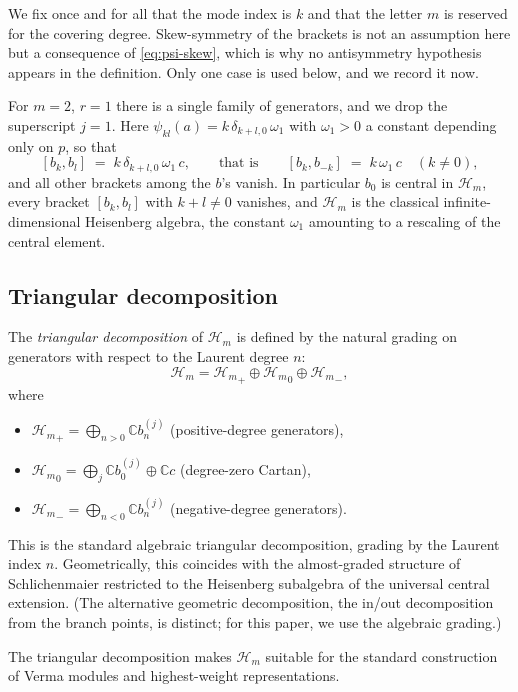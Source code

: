 \documentclass[12pt]{amsart}
\theoremstyle{plain}
\theoremstyle{definition}
\newcommand{\CC}{\mathbb{C}}
\newcommand{\Hm}{{\mathcal{H}_m}}     %
\begin{document}
We fix once and for all that the mode index is $k$ and that the letter
$m$ is reserved for the covering degree. Skew-symmetry of the brackets
is not an assumption here but a consequence of \eqref{eq:psi-skew},
which is why no antisymmetry hypothesis appears in the definition. Only
one case is used below, and we record it now.

For $m = 2$, $r = 1$ there is a single family of generators, and we drop
the superscript $j = 1$. Here
$\psi_{kl}(a) = k\,\delta_{k+l,0}\,\omega_1$ with $\omega_1 > 0$ a
constant depending only on $p$, so that
\begin{equation}\label{eq:psi-r1}
  [b_k, b_l] \;=\; k\,\delta_{k+l,0}\, \omega_1 \, c,
  \qquad\text{that is}\qquad
  [b_k, b_{-k}] \;=\; k\,\omega_1\,c \quad (k \neq 0),
\end{equation}
and all other brackets among the $b$'s vanish. In particular $b_0$ is
central in $\Hm$, every bracket $[b_k, b_l]$ with $k + l \neq 0$
vanishes, and $\Hm$ is the classical infinite-dimensional Heisenberg
algebra, the constant $\omega_1$ amounting to a rescaling of the central
element.

\subsection{Triangular decomposition}
\label{subsec:triangular}

The \emph{triangular decomposition} of $\Hm$ is defined by the
natural grading on generators with respect to the Laurent degree $n$:
\[
  \Hm = \Hm_+ \oplus \Hm_0 \oplus \Hm_-,
\]
where
\begin{itemize}
  \item $\Hm_+ = \bigoplus_{n > 0} \CC b_n^{(j)}$ (positive-degree generators),
  \item $\Hm_0 = \bigoplus_{j} \CC b_0^{(j)} \oplus \CC c$ (degree-zero Cartan),
  \item $\Hm_- = \bigoplus_{n < 0} \CC b_n^{(j)}$ (negative-degree generators).
\end{itemize}
This is the standard algebraic triangular decomposition, grading by
the Laurent index $n$. Geometrically, this coincides with the
almost-graded structure of Schlichenmaier \cite{Schlichenmaier2014}
restricted to the Heisenberg subalgebra of the universal central
extension. (The alternative geometric decomposition, the in/out decomposition
from the branch points, is distinct; for this paper, we use the
algebraic grading.)

The triangular decomposition makes $\Hm$ suitable for the standard
construction of Verma modules and highest-weight representations.
\end{document}
